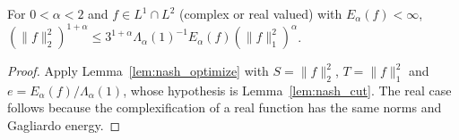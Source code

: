 \begin{theorem}\label{thm:fractional_nash}
\leanok
For $0 < \alpha < 2$ and $f \in L^1 \cap L^2$ (complex or real valued) with $E_\alpha(f) < \infty$, $(\lVert f \rVert_2^2)^{1+\alpha} \le 3^{1+\alpha} \Lambda_\alpha(1)^{-1} E_\alpha(f) (\lVert f \rVert_1^2)^\alpha$.
\end{theorem}

\begin{proof}
\leanok
Apply Lemma~\ref{lem:nash_optimize} with $S = \lVert f \rVert_2^2$, $T = \lVert f \rVert_1^2$ and $e = E_\alpha(f) / \Lambda_\alpha(1)$, whose hypothesis is Lemma~\ref{lem:nash_cut}. The real case follows because the complexification of a real function has the same norms and Gagliardo energy.
\end{proof}
